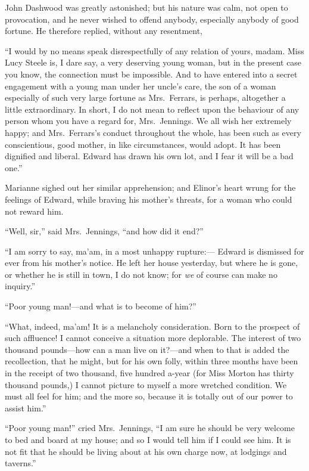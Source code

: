 \documentclass{article}
\begin{document}
John Dashwood was greatly astonished; but his nature
was calm, not open to provocation, and he never wished
to offend anybody, especially anybody of good fortune.
He therefore replied, without any resentment,

``I would by no means speak disrespectfully of any
relation of yours, madam.  Miss Lucy Steele is, I dare say,
a very deserving young woman, but in the present case
you know, the connection must be impossible.
And to have entered into a secret engagement with a
young man under her uncle's care, the son of a woman
especially of such very large fortune as Mrs.\ Ferrars,
is perhaps, altogether a little extraordinary. In short,
I do not mean to reflect upon the behaviour of any person
whom you have a regard for, Mrs.\ Jennings.  We all wish
her extremely happy; and Mrs.\ Ferrars's conduct throughout
the whole, has been such as every conscientious, good mother,
in like circumstances, would adopt.  It has been dignified
and liberal.  Edward has drawn his own lot, and I fear
it will be a bad one.''

Marianne sighed out her similar apprehension;
and Elinor's heart wrung for the feelings of Edward,
while braving his mother's threats, for a woman who could
not reward him.

``Well, sir,'' said Mrs.\ Jennings, ``and how did it end?''

``I am sorry to say, ma'am, in a most unhappy rupture:---%
Edward is dismissed for ever from his mother's notice.
He left her house yesterday, but where he is gone, or whether
he is still in town, I do not know; for \emph{we} of course can
make no inquiry.''

``Poor young man!---and what is to become of him?''

``What, indeed, ma'am!  It is a melancholy consideration.
Born to the prospect of such affluence!  I cannot conceive
a situation more deplorable.  The interest of two thousand
pounds---how can a man live on it?---and when to that is added
the recollection, that he might, but for his own folly,
within three months have been in the receipt of two
thousand, five hundred a-year (for Miss Morton has
thirty thousand pounds,) I cannot picture to myself
a more wretched condition.  We must all feel for him;
and the more so, because it is totally out of our power
to assist him.''

``Poor young man!'' cried Mrs.\ Jennings, ``I am sure
he should be very welcome to bed and board at my house;
and so I would tell him if I could see him.  It is not fit
that he should be living about at his own charge now,
at lodgings and taverns.''
\end{document}
